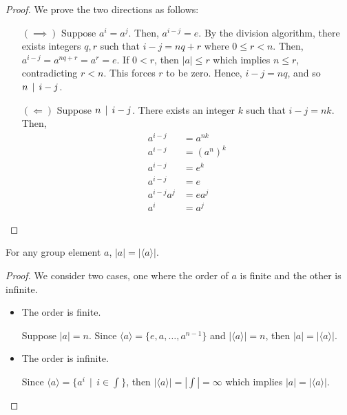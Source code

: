     \begin{proof} We prove the two directions as follows:
        \mbox{}
        \begin{itemize}
            \item[\((\implies)\)] Suppose \(a^{i} = a^{j}\). Then, \(a^{i - j} = e\). By the division algorithm, there exists integers \(q,r\) such that \(i - j = nq + r\) where \(0 \leq r < n\). Then, \(a^{i - j} = a^{nq + r} = a^r = e\). If \(0 < r\), then \(|a| \leq r\) which implies \(n \leq r\), contradicting \(r < n\). This forces \(r\) to be zero. Hence, \(i - j = nq\), and so \(n \,\mid\, i - j\).

            \item[\((\Longleftarrow)\)] Suppose \(n \,\mid\, i - j\). There exists an integer \(k\) such that \(i - j = nk\). Then,
            \begin{align*}
                a^{i - j} &= a^{nk} \\
                a^{i - j} &= (a^n)^k \\
                a^{i - j} &= e^k \\
                a^{i - j} &= e \\
                a^{i - j}a^j &= ea^j \\
                a^i &= a^j
            \end{align*}
        \end{itemize}
    \end{proof}

    \begin{cor}
        For any group element \(a\), \(|a| = |\langle a\rangle|\).
    \end{cor}

    \begin{proof}
        We consider two cases, one where the order of \(a\) is finite and the other is infinite.
        \begin{itemize}
            \item The order is finite.

            Suppose \(|a| = n\). Since \(\langle a\rangle = \{e, a, \ldots, a^{n - 1}\}\) and \(|\langle a\rangle| = n\), then \(|a| = |\langle a\rangle|\).

            \item The order is infinite.

            Since \(\langle a\rangle = \{a^{i} \,\mid\, i \in\int\}\), then \(|\langle a\rangle| = |\int| = \infty\) which implies \(|a| = |\langle a\rangle|\).
        \end{itemize}
    \end{proof}

